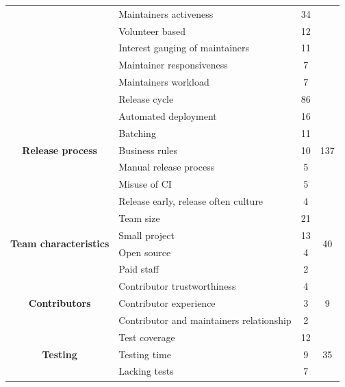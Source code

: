\begin{table}
\begin{tabular}{clcc}
		\cline{2-3}          & Maintainers activeness & 34    &  \bigstrut\\
		\cline{2-3}          & Volunteer based & 12    &  \bigstrut\\
		\cline{2-3}          & Interest gauging of maintainers & 11    &  \bigstrut\\
		\cline{2-3}          & \multicolumn{1}{p{10.085em}}{Maintainer  responsiveness} & 7     &  \bigstrut\\
		\cline{2-3}          & Maintainers workload & 7     &  \bigstrut\\
		\hline
		\multicolumn{1}{c}{\multirow{7}[12]{*}{\textbf{Release process}}} & Release cycle & 86    & \multirow{7}[12]{*}{137} \bigstrut\\
		\cline{2-3}          & Automated deployment & 16    &  \bigstrut\\
		\cline{2-3}          & Batching & 11    &  \bigstrut\\
		\cline{2-3}          & Business rules & 10    &  \bigstrut\\
		\cline{2-3}          & Manual release process & 5     & \bigstrut\\
		\cline{2-3}          & Misuse of CI & 5     &  \bigstrut\\
		\cline{2-3}          & \multicolumn{1}{p{10.085em}}{Release early, release often culture} & 4     &  \bigstrut\\
		\hline
		\multirow{4}[10]{*}{\textbf{Team characteristics}} & Team size & 21    & \multirow{4}[10]{*}{40} \bigstrut\\
		\cline{2-3}          & Small project & 13    &  \bigstrut\\
		\cline{2-3}          & Open source & 4     &  \bigstrut\\
		\cline{2-3}          & Paid staff & 2     &  \bigstrut\\
		\hline
		\multirow{3}[10]{*}{\textbf{Contributors}} & Contributor trustworthiness & 4     & \multirow{3}[10]{*}{9} \bigstrut\\
		\cline{2-3}          & Contributor experience & 3     &  \bigstrut\\
		\cline{2-3}          & \multicolumn{1}{p{10.085em}}{Contributor and maintainers relationship} & 2     &  \bigstrut\\
		\hline		
		\multirow{6}[11]{*}{\textbf{Testing}} & Test coverage & 12     & \multirow{6}[11]{*}{35} \bigstrut\\
		\cline{2-3}          & Testing time & 9    &  \bigstrut\\
		\cline{2-3}          & Lacking tests & 7     &  \bigstrut\\

\end{tabular}
\end{table}
